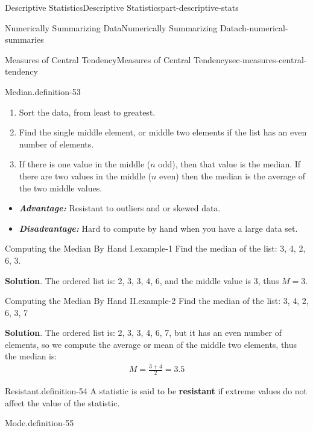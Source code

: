 \documentclass[oneside,10pt,]{book}
\newcommand{\alert}[1]{\textbf{\textit{#1}}}
\newcommand{\terminology}[1]{\textbf{#1}}
\numberwithin{equation}{section}
\begin{document}
\begin{partptx}{Descriptive Statistics}{}{Descriptive Statistics}{}{}{part-descriptive-stats}
\begin{chapterptx}{Numerically Summarizing Data}{}{Numerically Summarizing Data}{}{}{ch-numerical-summaries}
\begin{sectionptx}{Measures of Central Tendency}{}{Measures of Central Tendency}{}{}{sec-measures-central-tendency}
\begin{definition}{Median.}{definition-53}
\begin{enumerate}
\item\hypertarget{li-47}{}Sort the data, from least to greatest.%
\item\hypertarget{li-48}{}Find the single middle element, or middle two elements if the list has an even number of elements.%
\item\hypertarget{li-49}{}If there is one value in the middle (\(n\) odd), then that value is the median. If there are two values in the middle (\(n\) even) then the median is the average of the two middle values.%
\end{enumerate}
%
\par
\hypertarget{p-87}{}%
\leavevmode%
\begin{itemize}[label=\textbullet]
\item{}\alert{Advantage:} Resistant to outliers and or skewed data.%
\item{}\alert{Disadvantage:} Hard to compute by hand when you have a large data set.%
\end{itemize}
%
\end{definition}
\begin{example}{Computing the Median By Hand I.}{example-1}%
\hypertarget{p-88}{}%
Find the median of the list: 3, 4, 2, 6, 3.%
\par\smallskip%
\noindent\textbf{Solution}.\hypertarget{solution-8}{}\quad%
\hypertarget{p-89}{}%
The ordered list is: 2, 3, 3, 4, 6, and the middle value is 3, thus \(M=3\).%
\end{example}
\begin{example}{Computing the Median By Hand II.}{example-2}%
\hypertarget{p-90}{}%
Find the median of the list: 3, 4, 2, 6, 3, 7%
\par\smallskip%
\noindent\textbf{Solution}.\hypertarget{solution-9}{}\quad%
\hypertarget{p-91}{}%
The ordered list is: 2, 3, 3, 4, 6, 7, but it has an even number of elements, so we compute the average or mean of the middle two elements, thus the median is:%
\begin{gather*}
M = \frac{3+4}{2} = 3.5
\end{gather*}
%
\end{example}
\begin{definition}{Resistant.}{definition-54}%
\hypertarget{p-92}{}%
A statistic is said to be \terminology{resistant} if extreme values do not affect the value of the statistic.%
\end{definition}
\begin{definition}{Mode.}{definition-55}%

\end{definition}
\end{sectionptx}
\end{chapterptx}
\end{partptx}
\end{document}
